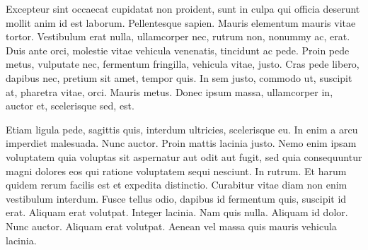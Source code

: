 Excepteur sint occaecat cupidatat non proident, sunt in culpa qui officia deserunt mollit anim id est laborum. Pellentesque sapien. Mauris elementum mauris vitae tortor. Vestibulum erat nulla, ullamcorper nec, rutrum non, nonummy ac, erat. Duis ante orci, molestie vitae vehicula venenatis, tincidunt ac pede. Proin pede metus, vulputate nec, fermentum fringilla, vehicula vitae, justo. Cras pede libero, dapibus nec, pretium sit amet, tempor quis. In sem justo, commodo ut, suscipit at, pharetra vitae, orci. Mauris metus. Donec ipsum massa, ullamcorper in, auctor et, scelerisque sed, est.

Etiam ligula pede, sagittis quis, interdum ultricies, scelerisque eu. In enim a arcu imperdiet malesuada. Nunc auctor. Proin mattis lacinia justo. Nemo enim ipsam voluptatem quia voluptas sit aspernatur aut odit aut fugit, sed quia consequuntur magni dolores eos qui ratione voluptatem sequi nesciunt. In rutrum. Et harum quidem rerum facilis est et expedita distinctio. Curabitur vitae diam non enim vestibulum interdum. Fusce tellus odio, dapibus id fermentum quis, suscipit id erat. Aliquam erat volutpat. Integer lacinia. Nam quis nulla. Aliquam id dolor. Nunc auctor. Aliquam erat volutpat. Aenean vel massa quis mauris vehicula lacinia.
\endinput